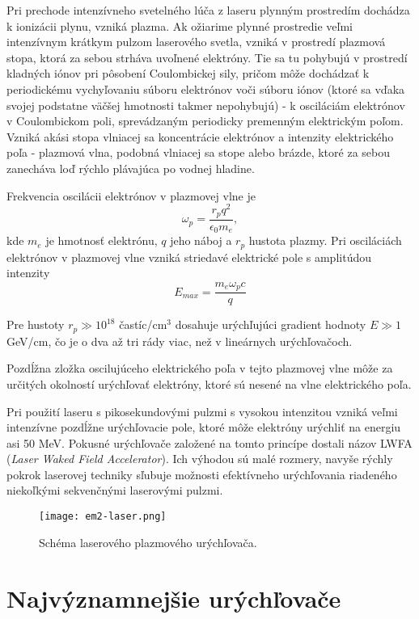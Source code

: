 \documentclass[../../main.tex]{subfiles}
\begin{document}
Pri prechode intenzívneho svetelného lúča z laseru plynným prostredím dochádza k ionizácii plynu, vzniká plazma. Ak ožiarime plynné prostredie veľmi intenzívnym krátkym pulzom laserového svetla, vzniká v prostredí plazmová stopa, ktorá za sebou strháva uvoľnené elektróny. Tie sa tu pohybujú v prostredí kladných iónov pri pôsobení Coulombickej sily, pričom môže dochádzať k periodickému vychyľovaniu súboru elektrónov voči súboru iónov (ktoré sa vďaka svojej podstatne väčšej hmotnosti takmer nepohybujú) - k osciláciám elektrónov v Coulombickom poli, sprevádzaným periodicky premenným elektrickým poľom. Vzniká akási stopa vlniacej sa koncentrácie elektrónov a intenzity elektrického poľa - plazmová vlna, podobná vlniacej sa stope alebo brázde, ktoré za sebou zanecháva loď rýchlo plávajúca po vodnej hladine.

Frekvencia oscilácii elektrónov v plazmovej vlne je
\begin{equation}
\omega_p=\dfrac{r_pq^2}{\epsilon_0m_e},
\end{equation}
kde $m_e$ je hmotnosť elektrónu, $q$ jeho náboj a $r_p$ hustota plazmy. Pri osciláciách elektrónov v plazmovej vlne vzniká striedavé elektrické pole s amplitúdou intenzity
\begin{equation}
E_{max}=\dfrac{m_e\omega_pc}{q}
\end{equation}

Pre hustoty $r_p\gg 10^{18}$ častíc/cm$^3$ dosahuje urýchľujúci gradient hodnoty $E\gg 1$ GeV/cm, čo je o dva až tri rády viac, než v lineárnych urýchľovačoch.

Pozdĺžna zložka oscilujúceho elektrického poľa v tejto plazmovej vlne môže za určitých okolností urýchľovať elektróny, ktoré sú nesené na vlne elektrického poľa.

Pri použití laseru s pikosekundovými pulzmi s vysokou intenzitou vzniká veľmi intenzívne pozdĺžne urýchľovacie pole, ktoré môže elektróny urýchliť na energiu asi 50 MeV. Pokusné urýchľovače založené na tomto princípe dostali názov LWFA (\textit{Laser Waked Field Accelerator}). Ich výhodou sú malé rozmery, navyše rýchly pokrok laserovej techniky sľubuje možnosti efektívneho urýchľovania riadeného niekoľkými sekvenčnými laserovými pulzmi.

\begin{figure}[h]
\centering
\texttt{[image: em2-laser.png]}
\caption{Schéma laserového plazmového urýchľovača.}
\label{em2:img:laser}
\end{figure}

\section{Najvýznamnejšie urýchľovače}
\end{document}
